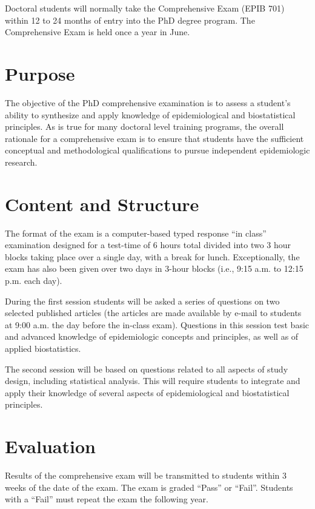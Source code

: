 \documentclass[
  openany]{book}
\begin{document}
Doctoral students will normally take the Comprehensive Exam (EPIB 701) within 12 to 24 months of entry into the PhD degree program. The Comprehensive Exam is held once a year in June.

\hypertarget{purpose}{%
\section{Purpose}\label{purpose}}

The objective of the PhD comprehensive examination is to assess a student's ability to synthesize and apply knowledge of epidemiological and biostatistical principles. As is true for many doctoral level training programs, the overall rationale for a comprehensive exam is to ensure that students have the sufficient conceptual and methodological qualifications to pursue independent epidemiologic research.

\hypertarget{content-and-structure}{%
\section{Content and Structure}\label{content-and-structure}}

The format of the exam is a computer-based typed response ``in class'' examination designed for a test-time of 6 hours total divided into two 3 hour blocks taking place over a single day, with a break for lunch. Exceptionally, the exam has also been given over two days in 3-hour blocks (i.e., 9:15 a.m. to 12:15 p.m. each day).

During the first session students will be asked a series of questions on two selected published articles (the articles are made available by e-mail to students at 9:00 a.m. the day before the in-class exam). Questions in this session test basic and advanced knowledge of epidemiologic concepts and principles, as well as of applied biostatistics.

The second session will be based on questions related to all aspects of study design, including statistical analysis. This will require students to integrate and apply their knowledge of several aspects of epidemiological and biostatistical principles.

\hypertarget{evaluation}{%
\section{Evaluation}\label{evaluation}}

Results of the comprehensive exam will be transmitted to students within 3 weeks of the date of the exam. The exam is graded ``Pass'' or ``Fail''. Students with a ``Fail'' must repeat the exam the following year.
\end{document}
